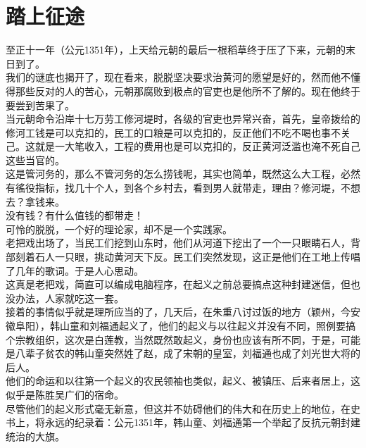 \section{踏上征途}
\ifnum{}
	\begin{multicols}{\theparacolNo}
\fi
至正十一年（公元1351年），上天给元朝的最后一根稻草终于压了下来，元朝的末日到了。\\

我们的谜底也揭开了，现在看来，脱脱坚决要求治黄河的愿望是好的，然而他不懂得那些反对的人的苦心，元朝那腐败到极点的官吏也是他所不了解的。现在他终于要尝到苦果了。\\

当元朝命令沿岸十七万劳工修河堤时，各级的官吏也异常兴奋，首先，皇帝拨给的修河工钱是可以克扣的，民工的口粮是可以克扣的，反正他们不吃不喝也事不关己。这就是一大笔收入，工程的费用也是可以克扣的，反正黄河泛滥也淹不死自己这些当官的。\\

这是管河务的，那么不管河务的怎么捞钱呢，其实也简单，既然这么大工程，必然有徭役指标，找几十个人，到各个乡村去，看到男人就带走，理由？修河堤，不想去？拿钱来。\\

没有钱？有什么值钱的都带走！\\

可怜的脱脱，一个好的理论家，却不是一个实践家。\\

老把戏出场了，当民工们挖到山东时，他们从河道下挖出了一个一只眼睛石人，背部刻着石人一只眼，挑动黄河天下反。民工们突然发现，这正是他们在工地上传唱了几年的歌词。于是人心思动。\\

这真是老把戏，简直可以编成电脑程序，在起义之前总要搞点这种封建迷信，但也没办法，人家就吃这一套。\\

接着的事情似乎就是理所应当的了，几天后，在朱重八讨过饭的地方（颖州，今安徽阜阳），韩山童和刘福通起义了，他们的起义与以往起义并没有不同，照例要搞个宗教组织，这次是白莲教，当然既然敢起义，身份也应该有所不同，于是，可能是八辈子贫农的韩山童突然姓了赵，成了宋朝的皇室，刘福通也成了刘光世大将的后人。\\

他们的命运和以往第一个起义的农民领袖也类似，起义、被镇压、后来者居上，这似乎是陈胜吴广们的宿命。\\

尽管他们的起义形式毫无新意，但这并不妨碍他们的伟大和在历史上的地位，在史书上，将永远的纪录着：公元1351年，韩山童、刘福通第一个举起了反抗元朝封建统治的大旗。\\


\end{multicols}
